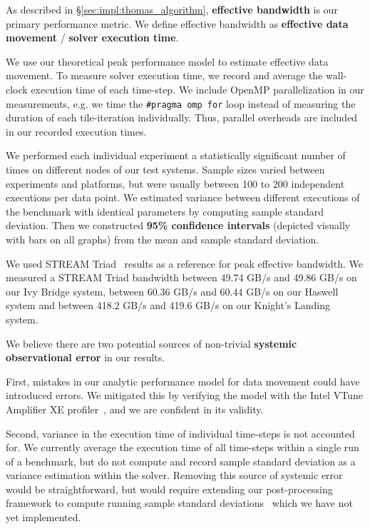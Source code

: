 \documentclass[10pt, conference, compsocconf]{IEEEtran}
\begin{document}
As described in \S\ref{sec:impl:thomas_algorithm}, \textbf{effective bandwidth}
  is our primary performance metric.
We define effective bandwidth as \textbf{effective data movement} /
  \textbf{solver execution time}.

We use our theoretical peak performance model to estimate effective data
  movement.
To measure solver execution time, we record and average the wall-clock
  execution time of each time-step. 
We include OpenMP parallelization in our measurements, e.g. we time the
  \lstinline{#pragma omp for} loop instead of measuring the duration of each
  tile-iteration individually.
Thus, parallel overheads are included in our recorded execution times.

We performed each individual experiment a statistically significant number of 
  times on different nodes of our test systems.
Sample sizes varied between experiments and platforms, but were usually between
  100 to 200 independent executions per data point.
We estimated variance between different executions of the benchmark with
  identical parameters by computing sample standard deviation.
Then we constructed \textbf{95\% confidence intervals} (depicted visually with
  bars on all graphs) from the mean and sample standard deviation.

We used STREAM Triad~\cite{stream} results as a reference for peak effective
  bandwidth.
We measured a STREAM Triad bandwidth between 49.74 GB/s and 49.86 GB/s on our
  Ivy Bridge system, between 60.36 GB/s and 60.44 GB/s on our Haswell system and
  between 418.2 GB/s and 419.6 GB/s on our Knight's Landing system.

We believe there are two potential sources of non-trivial \textbf{systemic
  observational error} in our results.

First, mistakes in our analytic performance model for data movement could
  have introduced errors.
We mitigated this by verifying the model with the Intel VTune Amplifier XE
  profiler~\cite{intel_vtune_amplifier}, and we are confident in its validity.

Second, variance in the execution time of individual time-steps is not accounted
  for.
We currently average the execution time of all time-steps within a single
  run of a benchmark, but do not compute and record sample standard
  deviation as a variance estimation within the solver.
Removing this source of systemic error would be straightforward, but
  would require extending our post-processing framework to compute running 
  sample standard deviations~\cite{benchmarking_cxx_code} which we have not
  yet implemented.
\end{document}
